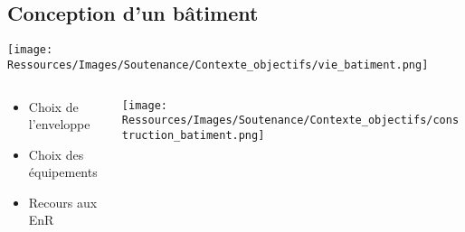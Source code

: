 \documentclass[xcolor=x11names, compress, 11pt]{beamer}
\begin{document}
\subsection{Conception d’un bâtiment}
\begin{frame}[c]
    \vfill
    \centering
    \texttt{[image: Ressources/Images/Soutenance/Contexte\_objectifs/vie\_batiment.png]}
    \begin{columns}
        \begin{column}{0.5\textwidth}
            \begin{itemize}
                \item Choix de l’enveloppe
                \item Choix des équipements
                \item Recours aux EnR
            \end{itemize}
        \end{column}%
        \begin{column}{0.7\textwidth}
            \centering
            \texttt{[image: Ressources/Images/Soutenance/Contexte\_objectifs/construction\_batiment.png]}
        \end{column}%
    \end{columns}%

    \vfill

\end{frame}


\end{document}
